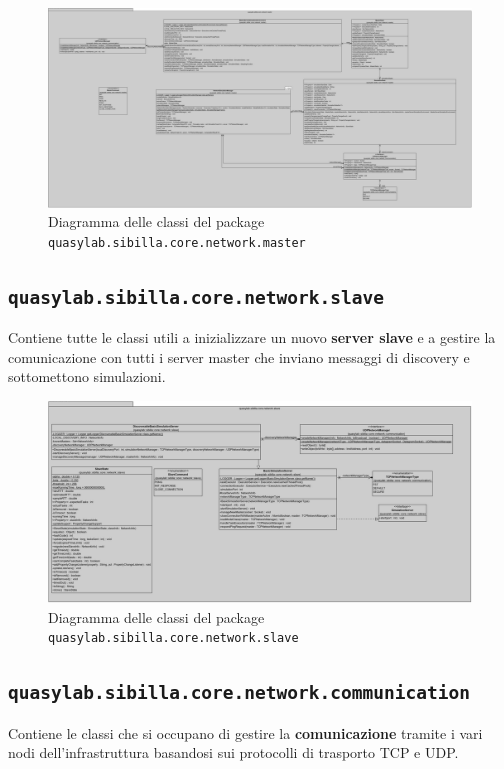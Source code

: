 \begin{figure}[H]
    \includegraphics[width=\linewidth]{images/quasylab.sibilla.core.network.master.png}
    \captionsetup{justification=centering}
    \caption{Diagramma delle classi del package \texttt{quasylab.sibilla.core.network.master}}
  \end{figure}

\subsection{\texttt{quasylab.sibilla.core.network.slave}} Contiene tutte le classi utili a inizializzare un nuovo \textbf{server slave} e a gestire la comunicazione con tutti i server master che inviano messaggi di discovery e sottomettono simulazioni.

\begin{figure}[H]
    \includegraphics[width=\linewidth]{images/quasylab.sibilla.core.network.slave.png}
    \captionsetup{justification=centering}
    \caption{Diagramma delle classi del package \texttt{quasylab.sibilla.core.network.slave}}
  \end{figure}

\subsection{\texttt{quasylab.sibilla.core.network.communication}} Contiene le classi che si occupano di gestire la \textbf{comunicazione} tramite i vari nodi dell’infrastruttura basandosi sui protocolli di trasporto TCP e UDP. 

